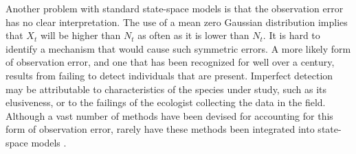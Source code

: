 \documentclass[12pt]{article}
\begin{document}
Another problem with standard state-space models is that the
observation error has no clear interpretation. The use of a mean zero
Gaussian distribution implies that $X_t$ will be
higher than $N_t$ as often as it is lower than $N_t$. 
It is hard to identify a mechanism that would cause such symmetric errors.
A more likely form of observation error, and one that has been recognized for well
over a century, results from failing to detect individuals that are
present. Imperfect detection may be attributable to
characteristics of the species under study, such as its elusiveness,
or to the failings of the ecologist collecting the data in the field.
Although a vast number of methods have been devised for accounting for
this form of observation error, rarely have these methods been
integrated into state-space models \citep[but
see][]{buckland_etal:2004}.
\end{document}
